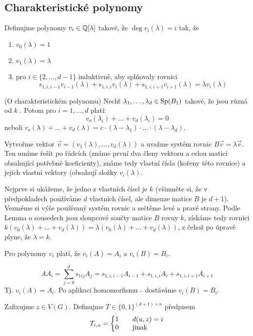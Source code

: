 \subsection{Charakteristické polynomy}



\df Definujme polynomy $v_i \in \mathbb{Q}[\lambda]$ takové, že $\deg v_i(\lambda) = i$ tak, že
\begin{enumerate} 
	\item $v_0(\lambda) = 1$
	\item $v_1(\lambda) = \lambda$
	\item pro $i \in \{ 2, \dots, d-1\}$ induktivně, aby splňovaly rovnici 
	$$
		s_{1,i,i-1} v_{i-1}(\lambda) + s_{1,i,i}v_i(\lambda) + s_{1,i,i+1}v_{i+1}(\lambda) = \lambda v_i(\lambda)
	$$
\end{enumerate}

\lm (O charakteristickém polynomu) Nechť $\lambda_1,\ldots,\lambda_d \in \operatorname{Sp}(B_1)$ takové, že jsou různá od $k$ . Potom pro $i=1, \dots, d$ platí:
$$
v_o(\lambda_i) + \ldots + v_d(\lambda_i)=0
$$ neboli $v_o(\lambda) + \ldots + v_d(\lambda) = c \cdot (\lambda - \lambda_1) \cdot \ldots \cdot (\lambda - \lambda_d)$.

\dk Vytvořme vektor $\vec{v} = (v_1(\lambda), \ldots, v_d(\lambda))$ a uvažme systém rovnic $B\vec{v} = \lambda \vec{v}$. Ten umíme řešit po řádcích (známe první dva členy vektoru a celou matici obsahující potřebné koeficienty), známe tedy vlastní čísla (kořeny této rovnice) a jejich vlastní vektory (obsahují složky $v_i(\lambda)$.

Nejprve si ukážeme, že jedno z vlastních čísel je $k$ (všimněte si, že v předpokladech používáme $d$ vlastních čísel, ale dimenze matice $B$ je $d+1$). Vezměme si výše používaný systém rovnic a sečtěme levé a pravé strany. Podle Lemma o sousedech jsou sloupcové součty matice $B$ rovny $k$, získáme tedy rovnici $k(v_0(\lambda) + \ldots + v_d(\lambda)) = \lambda (v_0(\lambda) + \ldots + v_d(\lambda))$, z čehož po úpravě plyne, že $\lambda = k$.


\lm Pro polynomy $v_i$ platí, že $v_i(A) = A_i$ a $v_i(B) = B_i$.

\dk $$AA_i=\sum^{d}_{j=0}s_{1ij}A_j=s_{1,i,i-1} A_{i-1} + s_{1,i,i}A_i + s_{1,i,i+1}A_{i+1}$$
Tj. $v_i(A)=A_i$. Po aplikaci homomorfismu $\widehat{~~}$ dostáváme $v_i(B)=B_i$.


\df Zafixujme $z\in V(G)$. Definujme $T\in\{0,1\}^{(d+1) \times n}$ předpisem
$$ T_{i,u} = \left\{\begin{matrix}
1\quad & d(u,z) = i\hfill \\
0\quad & \text{jinak}\hfill
\end{matrix}\right.$$

